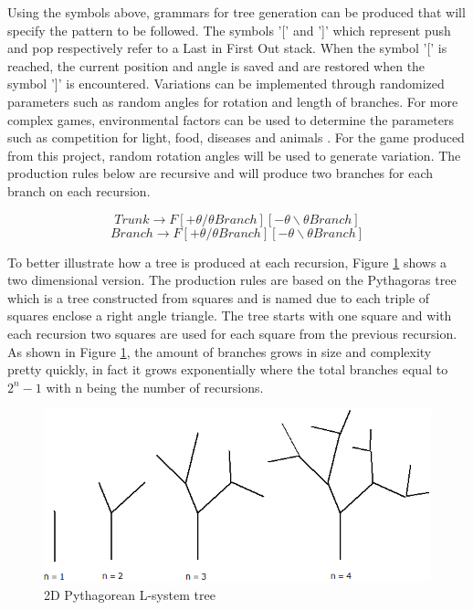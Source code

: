 Using the symbols above, grammars for tree generation can be produced that will specify the pattern to be followed. The symbols '[' and ']'  which represent push and pop respectively refer to a Last in First Out stack. When the symbol '[' is reached, the current position and angle is saved and are restored when the symbol ']' is encountered. Variations can be implemented through randomized parameters such as random angles for rotation and length of branches. For more complex games, environmental factors can be used to determine the parameters such as competition for light, food, diseases and animals \cite{plantslecture}. For the game produced from this project, random rotation angles will be used to generate variation. The production rules below are recursive and will produce two branches for each branch on each recursion.

\[Trunk \rightarrow F[+\theta /\theta Branch][-\theta \backslash\theta Branch]\]
\[Branch \rightarrow F[+\theta /\theta Branch][-\theta \backslash\theta Branch]\]

To better illustrate how a tree is produced at each recursion, Figure \ref{fig:tree} shows a two dimensional version. The production rules are based on the Pythagoras tree which is a tree constructed from squares and is named due to each triple of squares enclose a right angle triangle. The tree starts with one square and with each recursion two squares are used for each square from the previous recursion. As shown in Figure \ref{fig:tree}, the amount of branches grows in size and complexity pretty quickly, in fact it grows exponentially where the total branches equal to \(2^n - 1\) with n being the number of recursions.

\begin{figure}[h!]
 \centering
 \includegraphics[width=0.8\linewidth]{images/tree.png}
 \caption{2D Pythagorean L-system tree}
 \label{fig:tree}
\end{figure}

